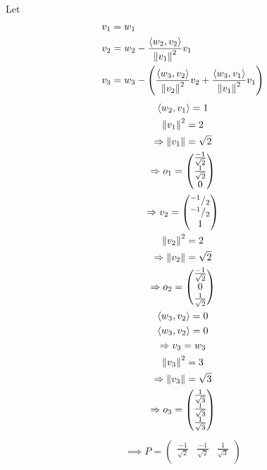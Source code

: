 \begin{enumerate}
\begin{align}
\end{align}
Let
\begin{align}
v_1 &= w_1\\
v_2 &= w_2 - \frac{\langle w_2,v_2\rangle}{\left\lVert v_1\right\rVert^2}v_1\\
v_3 &= w_3 - \left(\frac{\langle w_3,v_2\rangle}{\left\lVert v_2\right\rVert^2}v_2 +
  \frac{\langle w_3,v_1\rangle}{\left\lVert v_1\right\rVert^2}v_1\right)\\
\end{align}
\begin{gather}
\langle w_2,v_1 \rangle = 1\\
\left\lVert v_1\right\rVert^2 = 2\\
\Rightarrow \left\lVert v_1\right\rVert = \sqrt{2}\\
\Rightarrow o_1 = \begin{pmatrix}\frac{-1}{\sqrt{2}}\\\frac{1}{\sqrt{2}}\\0\end{pmatrix}\\
\Rightarrow v_2
= \begin{pmatrix}^{-1}/_{2}\\^{-1}/_{2}\\1\end{pmatrix}\\
\left\lVert v_2\right\rVert^2 = 2\\
\Rightarrow \left\lVert v_2\right\rVert = \sqrt{2}\\
\Rightarrow o_2 = \begin{pmatrix}\frac{-1}{\sqrt{2}}\\0\\\frac{1}{\sqrt{2}}\end{pmatrix}\\
\langle w_3,v_2\rangle = 0\\
\langle w_3,v_2 \rangle = 0\\
\Rightarrow v_3 = w_3\\
\left\lVert v_3\right\rVert^2 = 3\\
\Rightarrow \left\lVert v_3\right\rVert = \sqrt{3}\\
\Rightarrow o_3 = \begin{pmatrix}\frac{1}{\sqrt{3}}\\\frac{1}{\sqrt{3}}\\\frac{1}{\sqrt{3}}\end{pmatrix}
\end{gather}
\begin{gather}
\implies P = \begin{pmatrix}
\frac{-1}{\sqrt{2}} & \frac{-1}{\sqrt{2}} & \frac{1}{\sqrt{3}}\\

\end{pmatrix}
\end{gather}
\end{enumerate}
